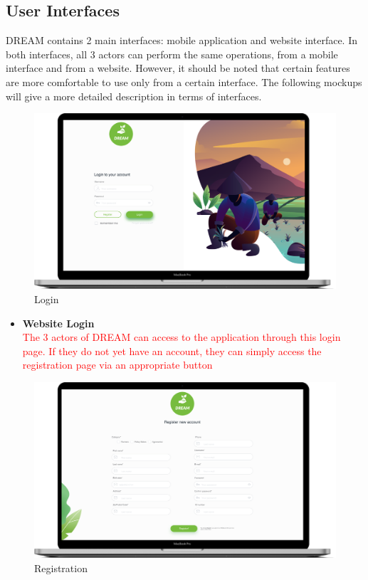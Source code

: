 \subsection{User Interfaces}
DREAM contains 2 main interfaces: mobile application and website interface.
In both interfaces, all 3 actors can perform the same operations, from a mobile interface and from a website.
However, it should be noted that certain features are more comfortable to use only from a certain interface.
The following mockups will give a more detailed description in terms of interfaces.

\begin{figure}[H]
  \includegraphics[width=140mm,scale=0.9]{./Images//Mocks/WebApp/Login.png}
  \caption{Login}
\end{figure}

\begin{itemize}
    \item \textbf{Website Login}\\ 
    \textcolor{red}{The 3 actors of DREAM can access to the application through this login page. If they do not yet have an account, they can simply access the registration page via an appropriate button}
\end{itemize}


\begin{figure}[H]
  \includegraphics[width=140mm,scale=0.9]{./Images//Mocks/WebApp/Registration.png}
  \caption{Registration}
\end{figure}

